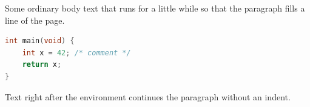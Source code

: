 \documentclass{article}
\begin{document}
Some ordinary body text that runs for a little while so that the paragraph fills a line of the page.
\begin{lstlisting}[language=C,basicstyle=\ttfamily]
int main(void) {
    int x = 42; /* comment */
    return x;
}
\end{lstlisting}
Text right after the environment continues the paragraph without an indent.
\end{document}
